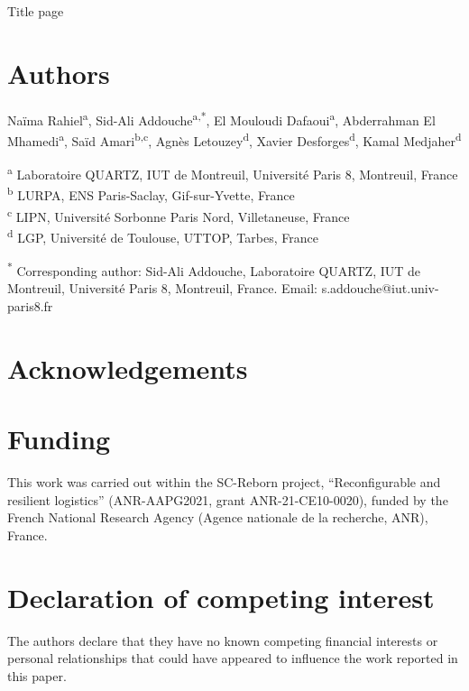 \documentclass[a4paper,11pt]{article}
\begin{document}
\begin{center}
{\Large\bfseries \ArticleTitle\par}
\vspace{10pt}
{\large Title page\par}
\end{center}

\section*{Authors}

Naïma Rahiel\textsuperscript{a},
Sid-Ali Addouche\textsuperscript{a,*},
El Mouloudi Dafaoui\textsuperscript{a},
Abderrahman El Mhamedi\textsuperscript{a},
Saïd Amari\textsuperscript{b,c},
Agnès Letouzey\textsuperscript{d},
Xavier Desforges\textsuperscript{d},
Kamal Medjaher\textsuperscript{d}

\textsuperscript{a} Laboratoire QUARTZ, IUT de Montreuil, Université Paris 8, Montreuil, France\\
\textsuperscript{b} LURPA, ENS Paris-Saclay, Gif-sur-Yvette, France\\
\textsuperscript{c} LIPN, Université Sorbonne Paris Nord, Villetaneuse, France\\
\textsuperscript{d} LGP, Université de Toulouse, UTTOP, Tarbes, France

\textsuperscript{*} Corresponding author: Sid-Ali Addouche, Laboratoire QUARTZ, IUT de Montreuil, Université Paris 8, Montreuil, France. Email: s.addouche@iut.univ-paris8.fr

\section*{Acknowledgements}


\section*{Funding}

This work was carried out within the SC-Reborn project, ``Reconfigurable and resilient logistics'' (ANR-AAPG2021, grant ANR-21-CE10-0020), funded by the French National Research Agency (Agence nationale de la recherche, ANR), France.

\section*{Declaration of competing interest}

The authors declare that they have no known competing financial interests or personal relationships that could have appeared to influence the work reported in this paper.


\end{document}
